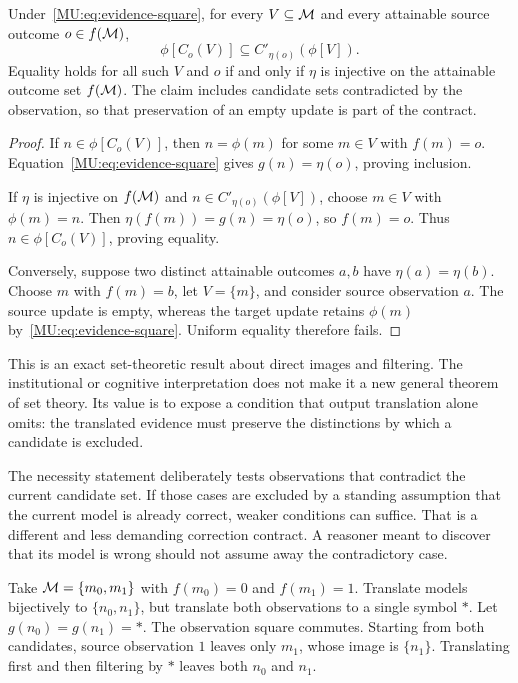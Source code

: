 \begin{MUtheorem}\label{MU:thm:correction}
Under~\eqref{MU:eq:evidence-square}, for every $V\subseteq\mathcal M$ and every attainable source outcome $o\in f(\mathcal M)$,
\begin{equation}\label{MU:eq:correction-inclusion}
\phi[C_o(V)]\subseteq C'_{\eta(o)}(\phi[V]).
\end{equation}
Equality holds for all such $V$ and $o$ if and only if $\eta$ is injective on the attainable outcome set $f(\mathcal M)$. The claim includes candidate sets contradicted by the observation, so that preservation of an empty update is part of the contract.
\end{MUtheorem}
\begin{proof}
If $n\in\phi[C_o(V)]$, then $n=\phi(m)$ for some $m\in V$ with $f(m)=o$. Equation~\eqref{MU:eq:evidence-square} gives $g(n)=\eta(o)$, proving inclusion.

If $\eta$ is injective on $f(\mathcal M)$ and $n\in C'_{\eta(o)}(\phi[V])$, choose $m\in V$ with $\phi(m)=n$. Then $\eta(f(m))=g(n)=\eta(o)$, so $f(m)=o$. Thus $n\in\phi[C_o(V)]$, proving equality.

Conversely, suppose two distinct attainable outcomes $a,b$ have $\eta(a)=\eta(b)$. Choose $m$ with $f(m)=b$, let $V=\{m\}$, and consider source observation $a$. The source update is empty, whereas the target update retains $\phi(m)$ by~\eqref{MU:eq:evidence-square}. Uniform equality therefore fails.
\end{proof}
This is an exact set-theoretic result about direct images and filtering. The institutional or cognitive interpretation does not make it a new general theorem of set theory. Its value is to expose a condition that output translation alone omits: the translated evidence must preserve the distinctions by which a candidate is excluded.

The necessity statement deliberately tests observations that contradict the current candidate set. If those cases are excluded by a standing assumption that the current model is already correct, weaker conditions can suffice. That is a different and less demanding correction contract. A reasoner meant to discover that its model is wrong should not assume away the contradictory case.

\begin{MUcounterexample}\label{MU:ex:correction}
Take $\mathcal M=\{m_0,m_1\}$ with $f(m_0)=0$ and $f(m_1)=1$. Translate models bijectively to $\{n_0,n_1\}$, but translate both observations to a single symbol $*$. Let $g(n_0)=g(n_1)=*$. The observation square commutes. Starting from both candidates, source observation $1$ leaves only $m_1$, whose image is $\{n_1\}$. Translating first and then filtering by $*$ leaves both $n_0$ and $n_1$.
\end{MUcounterexample}

